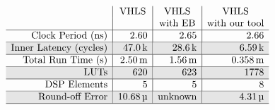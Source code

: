 \begin{table}[ht]
    \centering
    \renewcommand\arraycolsep{1.0mm}
    \newcommand\unitk{\,\text{k}}
    \newcommand\unitm{\,\text{m}}
    \newcommand\unitmu{\,\text{\textmu}}
    \newcommand\unitM{\,\text{M}}
    \newcommand\unitG{\,\text{G}}
    \newcommand\Mid[1]{\multirow{2}*{$#1$}}
    \newcommand\Shade{\cellcolor{black!10}}
    \newcommand\name[1]{\texttt{\scriptsize #1}}
    $\begin{array}{r|r|r|r}
        \multicolumn{1}{c|}{} &
        \multicolumn{1}{c|}{\text{VHLS}} &
        \multicolumn{1}{c|}{\text{VHLS}} &
        \multicolumn{1}{c}{\text{VHLS}} \\

        & &
        \multicolumn{1}{c|}{\text{with EB}} &
        \multicolumn{1}{c}{\text{with our tool}} \\ \hline

        \text{Clock Period (ns)} &
        2.60 & 2.65 & 2.66 \\ \hline

        \Shade \text{Inner Latency (cycles)} &
        \Shade 47.0\unitk & \Shade 28.6\unitk & \Shade 6.59\unitk \\ \hline

        \text{Total Run Time (s)} &
        2.50\unitm & 1.56\unitm & 0.358\unitm \\ \hline

        \Shade \text{LUTs} &
        \Shade 620 & \Shade 623 & \Shade 1778 \\ \hline

        \text{DSP Elements} &
        5 & 5 & 8 \\ \hline

        \Shade \text{Round-off Error} &
        \Shade 10.68\unitmu &
        \Shade \text{unknown} &
        \Shade 4.31\unitmu \\ \hline
    \end{array}$
    \caption{%
        Comparison between the fastest implementations.  The three columns
        respectively shows the original program with loop pipelining enabled,
        what Vivado HLS can achieve alone, and the capability of our tool.  It
        is important to note that the round-off error is unknown for Vivado
        HLS with EB, because it cannot predict the impact of its unsafe
        optimizations on accuracy.  We performed place-and-route for exact
        statistics.}
    \label{tab:seidel_results}
\end{table}

